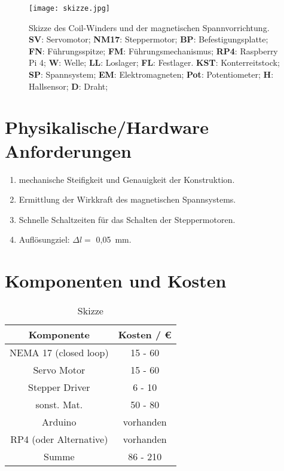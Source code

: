 \begin{figure}[H]
    \centering
    \texttt{[image: skizze.jpg]}
    \caption{
        Skizze des Coil-Winders und der magnetischen Spannvorrichtung.
        \textbf{SV}: Servomotor; 
        \textbf{NM17}: Steppermotor; 
        \textbf{BP}: Befestigungsplatte; 
        \textbf{FN}: Führungsspitze; 
        \textbf{FM}: Führungsmechanismus; 
        \textbf{RP4}: Raspberry Pi 4; 
        \textbf{W}: Welle; 
        \textbf{LL}: Loslager; 
        \textbf{FL}: Festlager.
        \textbf{KST}: Konterreitstock;
        \textbf{SP}: Spannsystem;
        \textbf{EM}: Elektromagneten;
        \textbf{Pot}: Potentiometer;
        \textbf{H}: Hallsensor;
        \textbf{D}: Draht;
    }
\end{figure}


\section*{Physikalische/Hardware Anforderungen}
\begin{enumerate}
    \item mechanische Steifigkeit und Genauigkeit der Konstruktion.
    \item Ermittlung der Wirkkraft des magnetischen Spannsystems.
    \item Schnelle Schaltzeiten für das Schalten der Steppermotoren.
    \item Auflösungziel: $\Delta l =$ 0,05~mm.
\end{enumerate}


\section*{Komponenten und Kosten}
\begin{table}[H]
    \centering
    \caption{
        Skizze
    }
    \begin{tabular}{| c | c |}
        \hline
        Komponente &  Kosten / \euro{}\\
        \hline
        NEMA 17 (closed loop)& 15 - 60  \\
        \hline
        Servo Motor & 15 - 60  \\
        \hline
        Stepper Driver & 6 - 10  \\
        \hline
        sonst. Mat. & 50 - 80 \\
        \hline
        Arduino & vorhanden \\
        \hline
        RP4 (oder Alternative) & vorhanden \\
        \hline
        \hline
        Summe & 86 - 210  \\
        \hline
    \end{tabular}
\end{table}



